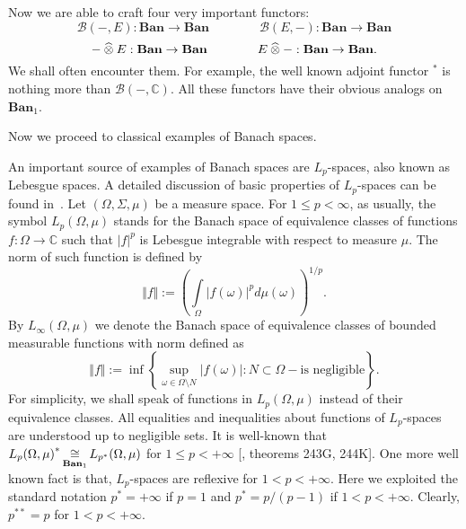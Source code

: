Now we are able to craft four very important functors:
$$
\mathcal{B}(-,E):\mathbf{Ban}\to\mathbf{Ban}
\qquad\qquad
\mathcal{B}(E,-):\mathbf{Ban}\to\mathbf{Ban}
$$
$$
-\mathbin{\widehat{\otimes}} E:\mathbf{Ban}\to\mathbf{Ban}
\qquad\qquad
E\mathbin{\widehat{\otimes}} -:\mathbf{Ban}\to\mathbf{Ban}.
$$
We shall often encounter them. For example, the well known adjoint functor
${}^*$ is nothing more than $\mathcal{B}(-,\mathbb{C})$. All these functors have
their obvious analogs on $\mathbf{Ban}_1$.

Now we  proceed to classical examples of Banach spaces. 

An important source of examples of Banach spaces are $L_p$-spaces, also known as
Lebesgue spaces. A detailed discussion of basic properties of $L_p$-spaces can
be found in~\cite{CarothShortCourseBanSp}.  Let $(\Omega,\Sigma,\mu)$ be a
measure space.  For $1\leq p<\infty$, as usually, the symbol $L_p(\Omega,\mu)$
stands for the Banach space of equivalence classes of functions
$f:\Omega\to\mathbb{C}$ such that $|f|^p$ is Lebesgue integrable with respect to
measure $\mu$. The norm of such function is defined by
$$
\Vert f\Vert
:={\left(
  \int\limits_{\Omega}{|f(\omega)|}^p d\mu(\omega)
\right)}^{1/p}.
$$ 
By $L_\infty(\Omega,\mu)$ we denote the Banach space of equivalence classes of
bounded measurable functions with norm defined as 
$$
\Vert f\Vert:=\inf\left \{
  \sup_{\omega\in\Omega\setminus N}|f(\omega)|
  :N\subset\Omega - \mbox{is negligible}
\right \}.
$$
For simplicity, we shall speak of functions in $L_p(\Omega,\mu)$ instead of their
equivalence classes. All equalities and inequalities about functions of
$L_p$-spaces are understood up to negligible sets. It is well-known that
${L_p(\Omega,\mu)}^*\mathop{\mathbin{\cong}}\limits_{\mathbf{Ban}_1}L_{p^*}(\Omega,\mu)$ for 
$1\leq p<+\infty$ [\cite{FremMeasTh}, theorems 243G, 244K]. 
One more well known fact is that, $L_p$-spaces are reflexive for 
$1<p<+\infty$. Here we exploited the standard 
notation $p^*=+\infty$ if $p=1$ and $p^*=p/(p-1)$ if $1<p<+\infty$.
Clearly, $p^{**}=p$ for $1<p<+\infty$.

